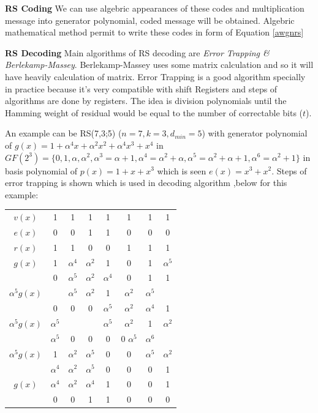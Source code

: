  \textbf{RS Coding} We can use algebric appearances of these codes and multiplication message into generator polynomial, coded message will be obtained. Algebric mathematical method permit to write these codes in form of Equation \ref{awgnrs}
 
\textbf{RS Decoding} Main algorithms of RS decoding are \textit{Error Trapping \& Berlekamp-Massey}. Berlekamp-Massey uses some matrix calculation and so it will have heavily calculation of matrix. Error Trapping is a good algorithm specially in practice because it's very compatible with shift Registers and steps of algorithms are done by registers. The idea is division polynomials until the Hamming weight of residual would be equal to the number of correctable bits ($t$)\citep{rs}. 

An example  can be RS(7,3;5) ($n = 7,k = 3, d_{min} = 5$) with generator polynomial of $g(x) = 1+\alpha^{4}x+\alpha^{2}x^{2}+\alpha^{4}x^{3}+x^{4}$ in $GF(2^{3}) = \lbrace0,1,\alpha,\alpha^{2},\alpha^{3} = \alpha + 1,\alpha^{4} = \alpha^{2}+\alpha,\alpha^{5}= \alpha^{2}+\alpha+ 1, \alpha^{6}= \alpha^{2}+ 1\rbrace$ in basis polynomial of $p(x) = 1 +x +x^{3}$   which is seen $e(x) = x^{3}+x^{2}$. Steps of error trapping is shown which is used in decoding algorithm ,below for this example:

\begin{tabular}{c|c|c|c|c|c|c|c}
$v(x)$  & 1 & 1 & 1 & 1 & 1 & 1 & 1\\
$e(x)$  &  0 & 0 & 1 & 1 & 0 & 0 & 0\\ \hline 
$r(x)$  &  1 & 1 & 0 & 0 & 1 & 1 & 1\\ 
$g(x)$  &  1 & $\alpha^{4}$ & $\alpha^{2}$ & 1 & 0 & 1 & $\alpha^{5}$\\ \hline
  & 0 & $\alpha^{5}$ & $\alpha^{2}$ & $\alpha^{4}$ & 0 & 1 & 1 \\
$\alpha^{5}g(x)$ &  & $\alpha^{5}$ & $\alpha^{2}$ & 1 & $\alpha^{2}$ & $\alpha^{5}$ & \\  \hline
  & 0 & 0 & 0 & $\alpha^{5}$ & $\alpha^{2}$ & $\alpha^{4}$ & 1 \\  
$\alpha^{5}g(x)$ & $\alpha^{5}$ & & & $\alpha^{5}$ & $\alpha^{2}$ & 1 & $\alpha^{2}$\\ \hline
 & $\alpha^{5}$ & 0 & 0 & 0 & 0 $\alpha^{5}$ & $\alpha^{6}$ \\
 $\alpha^{5}g(x)$ & 1 & $\alpha^{2}$ & $\alpha^{5}$ & 0 & 0 & $\alpha^{5}$ & $\alpha^{2}$\\ \hline
  & $\alpha^{4}$ & $\alpha^{2}$ & $\alpha^{5}$ & 0 & 0 & 0 & 1 \\
 $g(x)$ & $\alpha^{4}$ & $\alpha^{2}$ & $\alpha^{4}$ & 1 & 0 & 0 & 1\\ \hline   
  & 0 & 0 & 1 & 1 & 0 & 0 & 0\\ 
\end{tabular}
 
